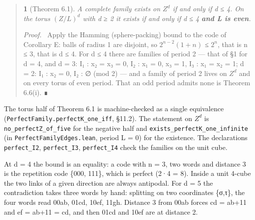 \documentclass[11pt,a4paper]{article}
\theoremstyle{named}
\newtheorem*{namedthm}{}
\newenvironment{mdproof}[1][Proof]{\par\medskip\noindent\textit{#1.}\ }{\par\medskip}
\begin{document}
\begin{quote}
\begin{namedthm}[Theorem 6.1]
A complete family exists on $Z^d$ if and only if d ≤ 4. On the torus $(Z/L)^d$ with d ≥ 2 it exists if and only if d ≤ 4 \textbf{and L is even}.
\end{namedthm}
\begin{mdproof}[Proof]
Apply the Hamming (sphere-packing) bound to the code of Corollary E: balls of radius 1 are disjoint, so $2^{n−2}(1+n)$ ≤ $2^n$, that is n ≤ 3, that is d ≤ 4. For d ≤ 4 there are families of period 2 — that of §1 for d = 4, and d = 3:  I₁ : x₂ = x₃ = 0,  I₂ : x₁ = 0, x₃ = 1,  I₃ : x₁ = x₂ = 1;   d = 2:  I₁ : x₂ = 0,  I₂ : ∅  (mod 2) — and a family of period 2 lives on $Z^d$ and on every torus of even period. That an odd period admits none is Theorem 6.6(i). ∎
\end{mdproof}
\end{quote}
The torus half of Theorem 6.1 is machine-checked as a single equivalence (\texttt{PerfectFamily.\allowbreak{}perfectK\_\allowbreak{}one\_\allowbreak{}iff}, §11.2). The statement on $Z^d$ is \texttt{no\_\allowbreak{}perfectZ\_\allowbreak{}of\_\allowbreak{}five} for the negative half and \texttt{exists\_\allowbreak{}perfectK\_\allowbreak{}one\_\allowbreak{}infinite} (in \texttt{PerfectFamilyEdges.lean}, period L = 0) for the existence. The declarations \texttt{perfect\_\allowbreak{}I2}, \texttt{perfect\_\allowbreak{}I3}, \texttt{perfect\_\allowbreak{}I4} check the families on the unit cube.

At d = 4 the bound is an equality: a code with n = 3, two words and distance 3 is the repetition code \{000, 111\}, which is perfect (2·4 = 8). Inside a unit 4-cube the two links of a given direction are always antipodal. For d = 5 the contradiction takes three words by hand: splitting on two coordinates \{σ,τ\}, the four words read 00ab, 01cd, 10ef, 11gh. Distance 3 from 00ab forces cd = ab+11 and ef = ab+11 = cd, and then 01cd and 10ef are at distance 2.
\end{document}
